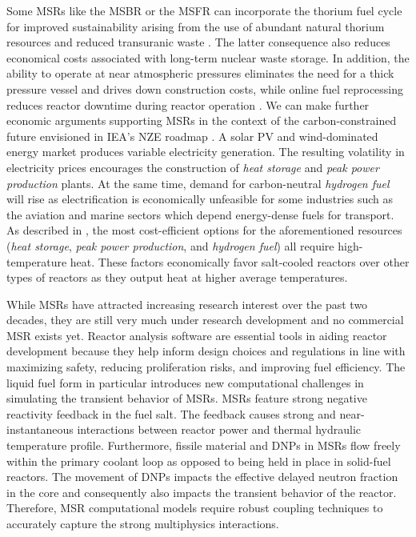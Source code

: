 Some \glspl{MSR} like the \gls{MSBR} or the \gls{MSFR} can
incorporate the thorium fuel cycle for improved sustainability arising from the
use of abundant natural thorium resources and reduced transuranic waste
\cite{heuer_towards_2014}. The latter consequence also reduces economical costs
associated with long-term nuclear waste storage. In addition, the ability to
operate at near atmospheric pressures eliminates the need for a thick pressure
vessel and drives down construction costs, while online fuel reprocessing
reduces reactor downtime during reactor operation \cite{dolan_1_2017}. We can
make further economic arguments supporting \glspl{MSR} in the context of the
carbon-constrained future envisioned in \gls{IEA}'s \gls{NZE} roadmap
\cite{iea_net_2021}. A solar \gls{PV} and wind-dominated energy market produces
variable electricity generation. The resulting volatility in electricity prices
encourages the construction of \textit{heat storage} and \textit{peak power
production} plants. At the same time, demand for carbon-neutral
\textit{hydrogen fuel} will rise as electrification is economically unfeasible
for some industries such as the aviation and marine sectors which depend
energy-dense fuels for transport. As described in
\cite{forsberg_market_2020}, the most cost-efficient options for the
aforementioned resources (\textit{heat storage}, \textit{peak power
production}, and \textit{hydrogen fuel}) all require high-temperature heat.
These factors economically favor salt-cooled reactors over other types of
reactors as they output heat at higher average temperatures.

While \glspl{MSR} have attracted increasing research interest over the past two
decades, they are still very much under research development and no commercial
\gls{MSR} exists yet. Reactor analysis software are essential tools in aiding
reactor development because they help inform design choices and regulations in
line with maximizing safety, reducing proliferation risks, and improving fuel
efficiency. The liquid fuel form in particular introduces new computational
challenges in simulating the transient behavior of \glspl{MSR}. \glspl{MSR}
feature strong negative reactivity feedback in the fuel salt. The feedback
causes strong and near-instantaneous interactions between reactor power and
thermal hydraulic temperature profile. Furthermore, fissile material
and \glspl{DNP} in \glspl{MSR} flow freely within the primary coolant
loop as opposed to being held in place in solid-fuel reactors. The movement of
\glspl{DNP} impacts the effective delayed neutron fraction in the core and
consequently also impacts the transient behavior of the reactor. Therefore,
\gls{MSR} computational models require robust coupling techniques to accurately
capture the strong multiphysics interactions.

